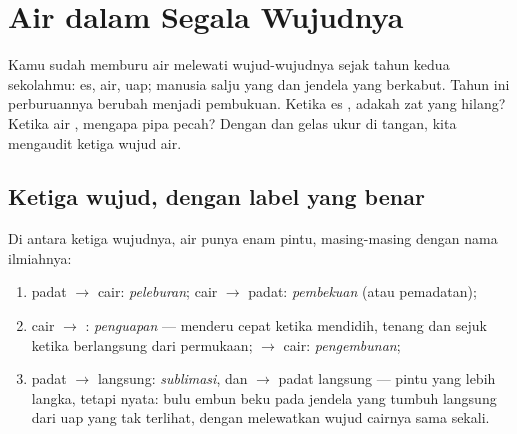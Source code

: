\chapter{Air dalam Segala Wujudnya}\label{ch:g6:water-states}

Kamu sudah memburu air melewati wujud-wujudnya sejak tahun kedua
sekolahmu: es, air, uap; manusia salju yang  dan jendela yang
berkabut. Tahun ini perburuannya berubah menjadi pembukuan. Ketika es
, adakah zat yang hilang? Ketika air , mengapa pipa
pecah? Dengan  dan gelas ukur di tangan, kita mengaudit ketiga
wujud air.

\section{Ketiga wujud, dengan label yang benar}

\begin{definition}\label{def:g6:water-states:changes}
Di antara ketiga wujudnya, air punya enam pintu, masing-masing dengan
nama ilmiahnya:
\begin{enumerate}
  \item padat $\to$ cair: \emph{peleburan}; cair
        $\to$ padat: \emph{pembekuan} (atau
        pemadatan);
  \item cair $\to$ : \emph{penguapan} ---
        menderu cepat ketika mendidih, tenang dan sejuk ketika
        berlangsung dari permukaan;  $\to$ cair:
        \emph{pengembunan};
  \item padat $\to$  langsung: \emph{sublimasi},
        dan  $\to$ padat langsung --- pintu yang lebih langka,
        tetapi nyata: bulu embun beku pada jendela yang 
        tumbuh langsung dari uap yang tak terlihat, dengan
        melewatkan wujud cairnya sama sekali.
\end{enumerate}
\end{definition}

